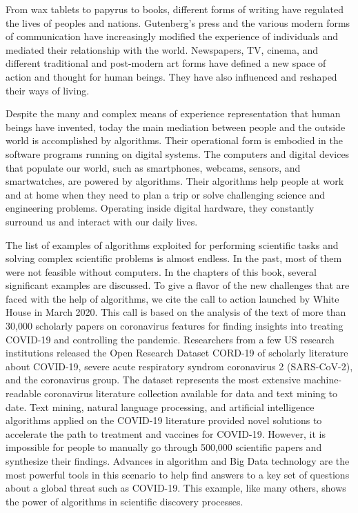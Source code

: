 From wax tablets to papyrus to books, different forms of writing have regulated the lives of peoples and nations. Gutenberg's press and the various modern forms of communication have increasingly modified the experience of individuals and mediated their relationship with the world. Newspapers, TV, cinema, and different traditional and post-modern art forms have defined a new space of action and thought for human beings. They have also influenced and reshaped their ways of living.

Despite the many and complex means of experience representation that human beings have invented, today the main mediation between people and the outside world is accomplished by algorithms. Their operational form is embodied in the software programs running on digital systems. The computers and digital devices that populate our world, such as smartphones, webcams, sensors, and smartwatches, are powered by algorithms. Their algorithms help people at work and at home when they need to plan a trip or solve challenging science and engineering problems. Operating inside digital hardware, they constantly surround us and interact with our daily lives.

The list of examples of algorithms exploited for performing scientific tasks and solving complex scientific problems is almost endless. In the past, most of them were not feasible without computers. In the chapters of this book, several significant examples are discussed. To give a flavor of the new challenges that are faced with the help of algorithms, we cite the call to action launched by White House in March 2020. This call is based on the analysis of the text of more than 30,000 scholarly papers on coronavirus features for finding insights into treating COVID-19 and controlling the pandemic. Researchers from a few US research institutions released the Open Research Dataset CORD-19 of scholarly literature about COVID-19, severe acute respiratory syndrom coronavirus 2 (SARS-CoV-2), and the coronavirus group. The dataset represents the most extensive machine-readable coronavirus literature collection available for data and text mining to date. Text mining, natural language processing, and artificial intelligence algorithms applied on the COVID-19 literature provided novel solutions to accelerate the path to treatment and vaccines for COVID-19. However, it is impossible for people to manually go through 500,000 scientific papers and synthesize their findings. Advances in algorithm and Big Data technology are the most powerful tools in this scenario to help find answers to a key set of questions about a global threat such as COVID-19. This example, like many others, shows the power of algorithms in scientific discovery processes.

